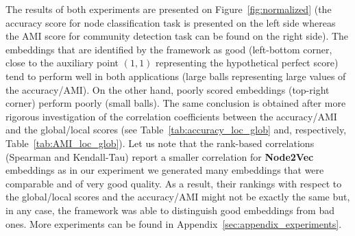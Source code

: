 \documentclass[11pt]{article}
\begin{document}
The results of both experiments are presented on Figure~\ref{fig:normalized} (the accuracy score for node classification task is presented on the left side whereas the AMI score for community detection task can be found on the right side). The embeddings that are identified by the framework as good (left-bottom corner, close to the auxiliary point $(1,1)$ representing the hypothetical perfect score) tend to perform well in both applications (large balls representing large values of the accuracy/AMI). On the other hand, poorly scored embeddings (top-right corner) perform poorly (small balls). The same conclusion is obtained after more rigorous investigation of the correlation coefficients between the accuracy/AMI and the global/local scores (see Table~\ref{tab:accuracy_loc_glob} and, respectively, Table~\ref{tab:AMI_loc_glob}). Let us note that the rank-based correlations (Spearman and Kendall-Tau) report a smaller correlation for \textbf{Node2Vec} embeddings as in our experiment we generated many embeddings that were comparable and of very good quality. As a result, their rankings with respect to the global/local scores and the accuracy/AMI might not be exactly the same but, in any case, the framework was able to distinguish good embeddings from bad ones. More experiments can be found in Appendix~\ref{sec:appendix_experiments}.
\end{document}

